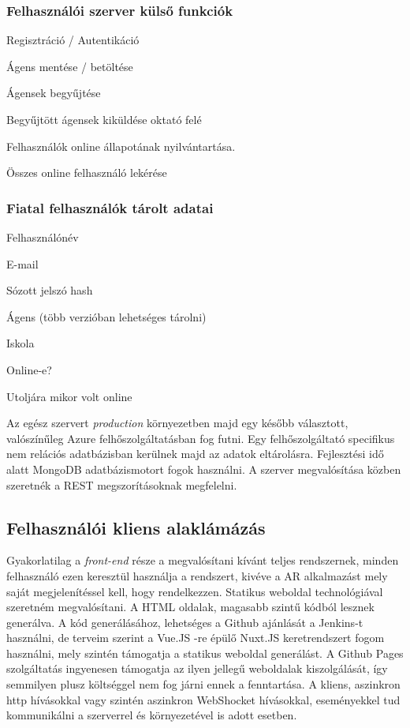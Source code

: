 \documentclass[12pt,a4paper,oneside]{report} %
\begin{document}
\subsubsection{Felhasználói szerver külső funkciók}
\begin{compactitem}
	\item Regisztráció / Autentikáció
	\item Ágens mentése / betöltése
	\item Ágensek begyűjtése
	\item Begyűjtött ágensek kiküldése oktató felé
	\item Felhasználók online állapotának nyilvántartása.
	\item Összes online felhasználó lekérése
\end{compactitem}
\subsubsection{Fiatal felhasználók tárolt adatai}
\begin{compactitem}
	\item Felhasználónév
	\item E-mail
	\item Sózott jelszó hash
	\item Ágens (több verzióban lehetséges tárolni)
	\item Iskola
	\item Online-e?
	\item Utoljára mikor volt online
\end{compactitem}
Az egész szervert \textit{production} környezetben majd egy később választott, valószínűleg Azure felhőszolgáltatásban fog futni. Egy felhőszolgáltató specifikus nem relációs adatbázisban  kerülnek majd az adatok eltárolásra. Fejlesztési idő alatt MongoDB adatbázismotort fogok használni.
A szerver megvalósítása közben szeretnék  a REST megszorításoknak megfelelni.


\subsection{Felhasználói kliens alaklámázás}
\label{felhkliens}
Gyakorlatilag a \textit{front-end} része a megvalósítani kívánt teljes rendszernek, minden felhasználó ezen keresztül használja a rendszert, kivéve a AR alkalmazást mely saját megjelenítéssel kell, hogy rendelkezzen.
Statikus weboldal technológiával szeretném megvalósítani. A HTML oldalak, magasabb szintű kódból lesznek generálva. A kód generálásához, lehetséges a Github ajánlását a Jenkins-t használni, de terveim szerint a Vue.JS -re épülő Nuxt.JS keretrendszert fogom használni, mely szintén támogatja a statikus weboldal generálást. A Github Pages szolgáltatás ingyenesen támogatja az ilyen jellegű weboldalak kiszolgálását, így semmilyen plusz költséggel nem fog járni ennek a fenntartása. A kliens, aszinkron http hívásokkal vagy szintén aszinkron WebShocket hívásokkal, eseményekkel tud kommunikálni a szerverrel és környezetével is adott esetben.
\end{document}
